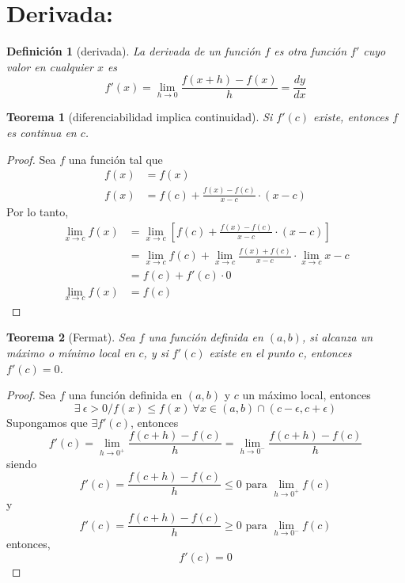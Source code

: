 \documentclass{report}
\newtheorem*{theorem}{Teorema}
\newtheorem*{definition}{Definición}
\begin{document}
  \chapter*{Derivada:}
    \begin{definition}[derivada]
      La derivada de un función $f$ es otra función $f'$ cuyo valor en cualquier
      $x$ es
      \begin{equation*}
        f'(x)=\lim_{h\to 0}\frac{f(x+h)-f(x)}{h}=\frac{dy}{dx}
      \end{equation*}
    \end{definition}
    \begin{theorem}[diferenciabilidad implica continuidad]
      Si $f'(c)$ existe, entonces $f$ es continua en $c$.
    \end{theorem}
    \begin{proof}
      Sea $f$ una función tal que
      \begin{align*}
        f(x)&=f(x)\\
        f(x)&=f(c)+\frac{f(x)-f(c)}{x-c}\cdot(x-c)
      \end{align*}
      Por lo tanto,
      \begin{align*}
        \lim_{x\to c}f(x)&=\lim_{x\to c}\left[f(c)+\frac{f(x)-f(c)}{x-c}\cdot(x-c)\right]\\
                         &=\lim_{x\to c}f(c)+\lim_{x\to c}\frac{f(x)+f(c)}{x-c}\cdot
                         \lim_{x\to c}x-c\\
                         &=f(c)+f'(c)\cdot0\\
        \lim_{x\to c}f(x)&=f(c)
      \end{align*}
    \end{proof}
    \begin{theorem}[Fermat]
      Sea $f$ una función definida en $(a,b)$, si alcanza un máximo o mínimo local en $c$, y 
      si $f'(c)$ existe en el punto $c$, entonces $f'(c)=0$.
    \end{theorem}
    \begin{proof}
      Sea $f$ una función definida en $(a,b)$ y $c$ un máximo local, entonces
      \begin{equation*}
        \exists\ \epsilon>0/f(x)\leqslant f(x)\ \forall x\in(a,b)\cap(c-\epsilon,c+\epsilon)
      \end{equation*}
      Supongamos que $\exists f'(c)$, entonces
      \begin{equation*}
        f'(c)=\lim_{h\to 0^+}\frac{f(c+h)-f(c)}{h}=\lim_{h\to 0^-}\frac{f(c+h)-f(c)}{h}
      \end{equation*}
      siendo
      \begin{equation*}
        f'(c)=\frac{f(c+h)-f(c)}{h}\leqslant0\text{ para }\lim_{h\to0^+}f(c)
      \end{equation*}
      y
      \begin{equation*}
        f'(c)=\frac{f(c+h)-f(c)}{h}\geqslant0\text{ para }\lim_{h\to0^-}f(c)
      \end{equation*}
      entonces,
      \begin{equation*}
        f'(c)=0
      \end{equation*}
    \end{proof}
\end{document}
